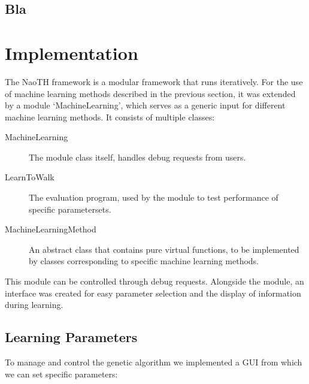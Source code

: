 \documentclass[a4paper, twocolumn]{article}
\begin{document}
\subsection{Bla}

\section{Implementation}
The NaoTH framework is a modular framework that runs iteratively.  For the use of machine learning methods described in the previous section, it was extended by a module `MachineLearning', which serves as a generic input for different machine learning methods. It consists of multiple classes:
\begin{description}
\item[MachineLearning] The module class itself, handles debug requests from users.
\item[LearnToWalk] The evaluation program, used by the module to test performance of specific parametersets.
\item[MachineLearningMethod] An abstract class that contains pure virtual functions, to be implemented by classes corresponding to specific machine learning methods.
\end{description}

This module can be controlled through debug requests. Alongside the module, an interface was created for easy parameter selection and the display of information during learning.

\subsection{Learning Parameters}

To manage and control the genetic algorithm we implemented a GUI from which we can set specific parameters:
\end{document}
